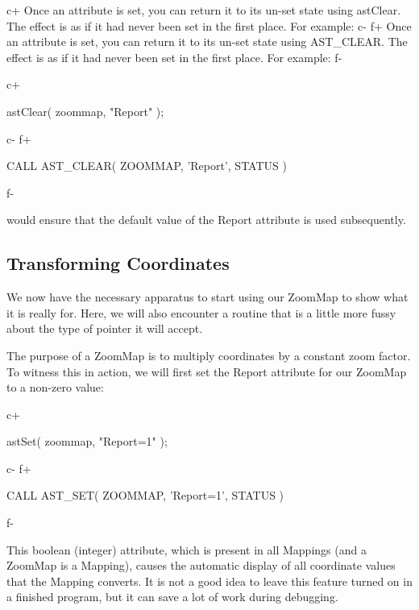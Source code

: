 \documentclass[twoside,11pt]{starlink}
\begin{document}
c+
Once an attribute is set, you can return it to its un-set state using
astClear. The effect is as if it had never been set in the first
place. For example:
c-
f+
Once an attribute is set, you can return it to its un-set state using
AST\_CLEAR. The effect is as if it had never been set in the first
place. For example:
f-

c+
\small
\begin{terminalv}
astClear( zoommap, "Report" );
\end{terminalv}
\normalsize
c-
f+
\small
\begin{terminalv}
      CALL AST_CLEAR( ZOOMMAP, 'Report', STATUS )
\end{terminalv}
\normalsize
f-

would ensure that the default value of the Report attribute is used
subsequently.


\subsection{\label{ss:transforming}Transforming Coordinates}

We now have the necessary apparatus to start using our ZoomMap to show
what it is really for. Here, we will also encounter a routine that is
a little more fussy about the type of pointer it will accept.

The purpose of a ZoomMap is to multiply coordinates by a constant zoom
factor. To witness this in action, we will first set the Report
attribute for our ZoomMap to a non-zero value:

c+
\small
\begin{terminalv}
astSet( zoommap, "Report=1" );
\end{terminalv}
\normalsize
c-
f+
\small
\begin{terminalv}
      CALL AST_SET( ZOOMMAP, 'Report=1', STATUS )
\end{terminalv}
\normalsize
f-

This boolean (integer) attribute, which is present in all Mappings
(and a ZoomMap is a Mapping), causes the automatic display of all
coordinate values that the Mapping converts. It is not a good idea to
leave this feature turned on in a finished program, but it can save a
lot of work during debugging.
\end{document}
